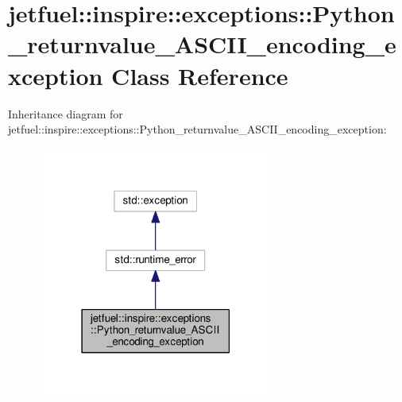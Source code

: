 \hypertarget{classjetfuel_1_1inspire_1_1exceptions_1_1Python__returnvalue__ASCII__encoding__exception}{}\section{jetfuel\+:\+:inspire\+:\+:exceptions\+:\+:Python\+\_\+returnvalue\+\_\+\+A\+S\+C\+I\+I\+\_\+encoding\+\_\+exception Class Reference}
\label{classjetfuel_1_1inspire_1_1exceptions_1_1Python__returnvalue__ASCII__encoding__exception}


Inheritance diagram for jetfuel\+:\+:inspire\+:\+:exceptions\+:\+:Python\+\_\+returnvalue\+\_\+\+A\+S\+C\+I\+I\+\_\+encoding\+\_\+exception\+:\nopagebreak
\begin{figure}[H]
\begin{center}
\leavevmode
\includegraphics[width=219pt]{classjetfuel_1_1inspire_1_1exceptions_1_1Python__returnvalue__ASCII__encoding__exception__inherit__graph}
\end{center}
\end{figure}


